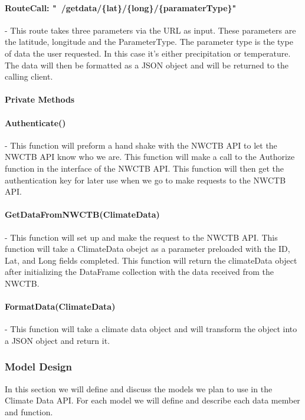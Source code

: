 \documentclass[onecolumn, draftclsnofoot,10pt, compsoc]{article}
\begin{document}
					\paragraph{RouteCall: "~/getdata/\{lat\}/\{long\}/\{paramaterType\}"} - This route takes three parameters via the URL as input. These parameters are the latitude, longitude and the ParameterType. The parameter type is the type of data the user requested. In this case it's either precipitation or temperature. The data will then be formatted as a JSON object and will be returned to the calling client.\\
					
					\paragraph{\textbf{Private Methods}}
					
					\paragraph{Authenticate()} - This function will preform a hand shake with the NWCTB API to let the NWCTB API know who we are. This function will make a call to the Authorize function in the interface of the NWCTB API. This function will then get the authentication key for later use when we go to make requests to the NWCTB API.\\
					\paragraph{GetDataFromNWCTB(ClimateData)} - This function will set up and make the request to the NWCTB API. This function will take a ClimateData obejct as a parameter preloaded with the ID, Lat, and Long fields completed. This function will return the climateData object after initializing the DataFrame collection with the data received from the NWCTB.\\
					\paragraph{FormatData(ClimateData)} - This function will take a climate data object and will transform the object into a JSON object and return it.\\
					
				\subsubsection{Model Design}
					In this section we will define and discuss the models we plan to use in the Climate Data API. For each model we will define and describe each data member and function.\\
					
\end{document}
